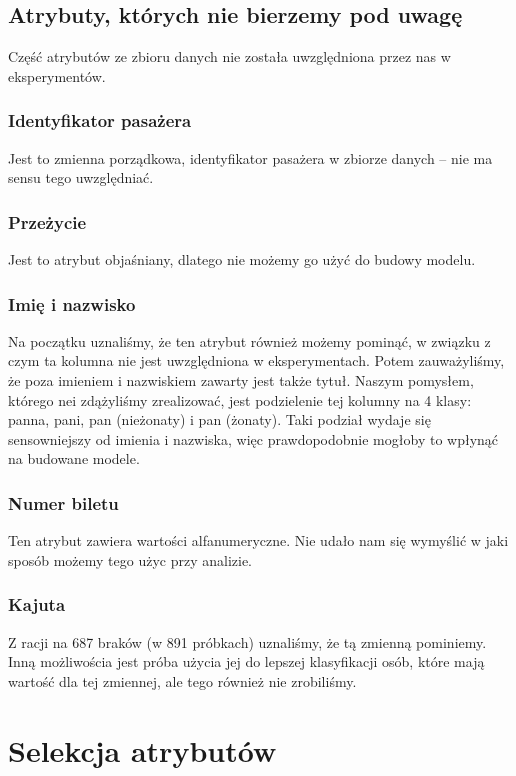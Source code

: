 \documentclass{article}
\begin{document}
\subsection{Atrybuty, których nie bierzemy pod uwagę}
Część atrybutów ze zbioru danych nie została uwzględniona przez nas w eksperymentów.

\subsubsection{Identyfikator pasażera}
Jest to zmienna porządkowa, identyfikator pasażera w zbiorze danych -- nie ma sensu tego uwzględniać.

\subsubsection{Przeżycie}
Jest to atrybut objaśniany, dlatego nie możemy go użyć do budowy modelu.

\subsubsection{Imię i nazwisko}
Na początku uznaliśmy, że ten atrybut również możemy pominąć, w związku z czym ta kolumna nie jest uwzględniona w eksperymentach.
Potem zauważyliśmy, że poza imieniem i nazwiskiem zawarty jest także tytuł. Naszym pomysłem, którego nei zdążyliśmy zrealizować,
jest podzielenie tej kolumny na 4 klasy: panna, pani, pan (nieżonaty) i pan (żonaty). Taki podział wydaje się sensowniejszy od imienia i nazwiska,
więc prawdopodobnie mogłoby to wpłynąć na budowane modele.

\subsubsection{Numer biletu}
Ten atrybut zawiera wartości alfanumeryczne. Nie udało nam się wymyślić w jaki sposób możemy tego użyc przy analizie.

\subsubsection{Kajuta}
Z racji na 687 braków (w 891 próbkach) uznaliśmy, że tą zmienną pominiemy.
Inną możliwościa jest próba użycia jej do lepszej klasyfikacji osób, które mają wartość dla tej zmiennej, ale tego również nie zrobiliśmy.

\section{Selekcja atrybutów}
\label{attrSelec}
\end{document}
